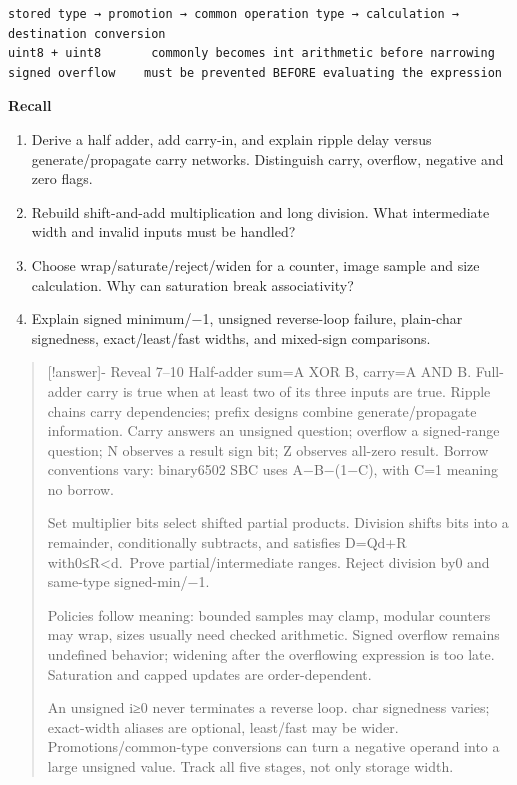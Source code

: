 \begin{verbatim}
stored type → promotion → common operation type → calculation → destination conversion
uint8 + uint8       commonly becomes int arithmetic before narrowing
signed overflow    must be prevented BEFORE evaluating the expression
\end{verbatim}

\textbf{Recall}

\begin{enumerate}
\def\labelenumi{\arabic{enumi}.}
\setcounter{enumi}{6}
\tightlist
\item
  Derive a half adder, add carry-in, and explain ripple delay versus generate/propagate carry networks. Distinguish carry, overflow, negative and zero flags.
\item
  Rebuild shift-and-add multiplication and long division. What intermediate width and invalid inputs must be handled?
\item
  Choose wrap/saturate/reject/widen for a counter, image sample and size calculation. Why can saturation break associativity?
\item
  Explain signed minimum/−1, unsigned reverse-loop failure, plain-char signedness, exact/least/fast widths, and mixed-sign comparisons.
\end{enumerate}

\begin{quote}
{[}!answer{]}- Reveal 7--10 Half-adder sum=A XOR B, carry=A AND B. Full-adder carry is true when at least two of its three inputs are true. Ripple chains carry dependencies; prefix designs combine generate/propagate information. Carry answers an unsigned question; overflow a signed-range question; N observes a result sign bit; Z observes all-zero result. Borrow conventions vary: binary6502 SBC uses A−B−(1−C), with C=1 meaning no borrow.

Set multiplier bits select shifted partial products. Division shifts bits into a remainder, conditionally subtracts, and satisfies D=Qd+R with0≤R\textless d.~Prove partial/intermediate ranges. Reject division by0 and same-type signed-min/−1.

Policies follow meaning: bounded samples may clamp, modular counters may wrap, sizes usually need checked arithmetic. Signed overflow remains undefined behavior; widening after the overflowing expression is too late. Saturation and capped updates are order-dependent.

An unsigned i≥0 never terminates a reverse loop. char signedness varies; exact-width aliases are optional, least/fast may be wider. Promotions/common-type conversions can turn a negative operand into a large unsigned value. Track all five stages, not only storage width.
\end{quote}

